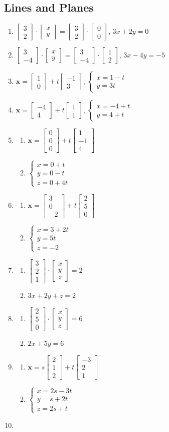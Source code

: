 \documentclass{article}
\newcommand{\vx}{\mathbf{x}}
\newcommand{\colvecTwo}[2]{
  \begin{bmatrix}
    #1 \\
    #2
  \end{bmatrix}
}
\newcommand{\colvecThree}[3]{
  \begin{bmatrix}
    #1 \\
    #2 \\
    #3
  \end{bmatrix}
}
\newcommand{\casesTwo}[2]{
  \begin{cases}
    #1 \\
    #2
  \end{cases}
}
\newcommand{\casesThree}[3]{
  \begin{cases}
    #1 \\
    #2 \\
    #3
  \end{cases}
}
\begin{document}
\subsection{Lines and Planes}
\begin{enumerate}
  \item $\colvecTwo{3}{2}\cdot\colvecTwo{x}{y}=\colvecTwo{3}{2}\cdot\colvecTwo{0}{0}$, $3x+2y=0$
  \item $\colvecTwo{3}{-4}\cdot\colvecTwo{x}{y}=\colvecTwo{3}{-4}\cdot\colvecTwo{1}{2}$, $3x-4y=-5$
  \item $\vx=\colvecTwo{1}{0}+t\colvecTwo{-1}{3}$, $\casesTwo{x=1-t}{y=3t}$
  \item $\vx=\colvecTwo{-4}{4}+t\colvecTwo{1}{1}$, $\casesTwo{x=-4+t}{y=4+t}$
  \item
    \begin{enumerate}
      \item $\vx=\colvecThree{0}{0}{0}+t\colvecThree{1}{-1}{4}$
      \item $\casesThree{x=0+t}{y=0-t}{z=0+4t}$
    \end{enumerate}
  \item
    \begin{enumerate}
      \item $\vx=\colvecThree{3}{0}{-2}+t\colvecThree{2}{5}{0}$
      \item $\casesThree{x=3+2t}{y=5t}{z=-2}$
    \end{enumerate}
  \item
    \begin{enumerate}
      \item $\colvecThree{3}{2}{1}\cdot\colvecThree{x}{y}{z}=2$
      \item $3x+2y+z=2$
    \end{enumerate}
  \item
    \begin{enumerate}
      \item $\colvecThree{2}{5}{0}\cdot\colvecThree{x}{y}{z}=6$
      \item $2x+5y=6$
    \end{enumerate}
  \item
    \begin{enumerate}
      \item $\vx=s\colvecThree{2}{1}{2}+t\colvecThree{-3}{2}{1}$
      \item $\casesThree{x=2s-3t}{y=s+2t}{z=2s+t}$
    \end{enumerate}
  \item
    \begin{enumerate}

\end{enumerate}
\end{enumerate}
\end{document}
